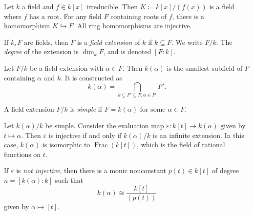 
\begin{theorem}\label{kd}
	Let $k$ a field and $f\in k[x]$ irreducible. Then $K\coloneqq k[x]/(f(x))$ is a field where $f$ has a root. For any field $F$ containing roots of $f$, there is a homomorphism $K\hookrightarrow F$. All ring homomorphisms are injective.
\end{theorem}
\begin{definition}\label{ksjhb}
	If $k,F$ are fields, then $F$ is a \emph{field extension} of $k$ if $k\subseteq F$. We write $F/k$. The \emph{degree} of the extension is $\dim _kF$, and is denoted $[F : k]$.
\end{definition}
\begin{definition}\label{ksjnfdk}
	Let $F/k$ be a field extension with $\alpha \in F$. Then $k(\alpha )$ is the smallest subfield of $F$ containing $\alpha $ and $k$. It is constructed as
	\[
		k(\alpha )= \bigcap_{k\subseteq F'\subseteq F,\alpha \in F'} F'
	.\]
\end{definition}

\begin{definition}\label{asodsfsofn}
	A field extension $F/k$ is \emph{simple} if $F=k(\alpha )$ for some $\alpha \in F$.
\end{definition}
\begin{proposition}\label{owo}
	Let $k(\alpha ) /k$ be simple. Consider the evaluation map $\varepsilon : k[t] \to k(\alpha )$ given by $t\mapsto \alpha $. Then $\varepsilon $ is injective if and only if $k(\alpha ) /k$ is an infinite extension. In this case, $k(\alpha )$ is isomorphic to $\operatorname{Frac} (k[t])$, which is the field of rational functions on $t$.

	If $\varepsilon $ is \emph{not injective}, then there is a monic nonconstant $p(t)\in k[t]$ of degree $n=[k(\alpha ): k]$ such that
	\[
		k(\alpha ) \cong \frac{k[t]}{(p(t))} 
	\]
	given by $\alpha \mapsto [t]$.
\end{proposition}

